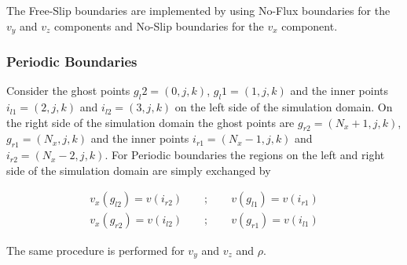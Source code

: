 The Free-Slip boundaries are implemented by using No-Flux boundaries for
the $v_y$ and $v_z$ components and No-Slip boundaries for the $v_x$ component.

\subsubsection{Periodic Boundaries}

Consider the ghost points $g_l2=(0, j, k)$, $g_l1=(1, j, k)$ and the inner points $i_{l1}=(2, j, k)$ and $i_{l2}=(3, j, k)$ on the left side of
the simulation domain.
On the right side of the simulation domain the ghost points are $g_{r2}=(N_x+1, j, k)$, $g_{r1}=(N_x, j, k)$
and the inner points $i_{r1}=(N_x-1, j, k)$ and $i_{r2}=(N_x - 2, j, k)$.
For Periodic boundaries the regions on the left and right side of the simulation domain are simply exchanged by

\begin{align}
    v_x(g_{l2}) = v(i_{r2}) \qquad ; \qquad v(g_{l1}) = v(i_{r1})\\
    v_x(g_{r2}) = v(i_{l2}) \qquad ; \qquad v(g_{r1}) = v(i_{l1})
\end{align}

The same procedure is performed for $v_y$ and $v_z$ and $\rho$.

%
%



